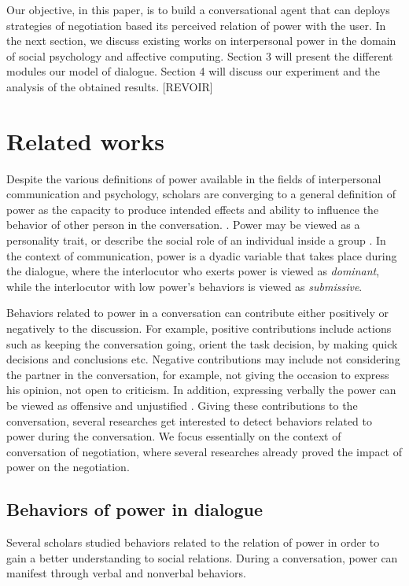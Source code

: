 \documentclass{llncs}
\begin{document}
	Our objective, in this paper, is to build a conversational agent that can deploys strategies of negotiation based its perceived relation of power with the user. In the next section, we discuss existing works on interpersonal power in the domain of social psychology and affective computing. Section 3 will present the different modules our model of dialogue. Section 4 will discuss our experiment and the analysis of the obtained results.
	[REVOIR]
	
	
	\section{Related works}
	\par Despite the various definitions of power available in the fields of interpersonal communication and psychology, scholars are converging to a general definition of power as the capacity to produce intended effects and ability to influence the behavior of other person in the conversation. \cite{dunbar2005perceptions}. Power may be viewed as a personality trait, or describe the social role of an individual inside a group \cite{kecskes2013research}. In the context of communication, power is a dyadic variable that takes place during the dialogue, where the interlocutor who exerts power is viewed as \textit{dominant}, while the interlocutor with low power's behaviors is viewed as \textit{submissive}. 
	\par Behaviors related to power in a conversation can contribute either positively or negatively to the discussion. For example, positive contributions include actions such as keeping the conversation going, orient the task decision, by making quick decisions and conclusions etc. Negative contributions may include not considering the partner in the conversation, for example, not giving the occasion to express his opinion, not open to criticism. In addition, expressing verbally the power can be viewed as offensive and unjustified \cite{zablotskaya2012relating}. Giving these contributions to the conversation, several researches get interested to detect behaviors related to power during the conversation. We focus essentially on the context of conversation of negotiation, where several researches already proved the impact of power on the negotiation\cite{van2006power}.
	
	\subsection{Behaviors of power in dialogue}
	\label{domDialogue}
	Several scholars studied behaviors related to the relation of power in order to gain a better understanding to social relations. During a conversation, power can manifest through verbal and nonverbal behaviors.
	
\end{document}
